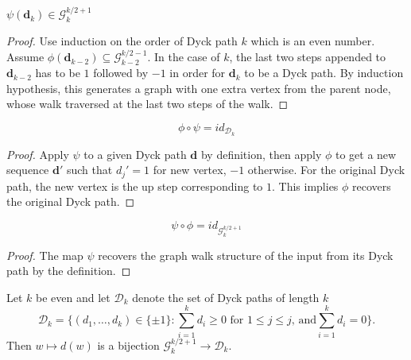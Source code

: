 \begin{lemma}
  \notready
  \label{lem:Dyck_graph_correspondence}
  $\psi(\mathbf{d}_k) \in \mathcal{G}^{k/2 + 1}_k$
\end{lemma}

\begin{proof}
  \notready
  Use induction on the order of Dyck path $k$ which is an even number. Assume $\phi(\mathbf{d}_{k-2})
  \subseteq \mathcal{G}_{k-2}^{k/2 -1}$. In the case of $k$, the last two steps appended to $\mathbf{d}_{k-2}$
  has to be $1$ followed by $-1$ in order for $\mathbf{d}_k$ to be a Dyck path. By induction hypothesis,
  this generates a graph with one extra vertex from the parent node, whose walk traversed at the last two steps of the walk.
\end{proof}


\begin{lemma}
  \notready
  \label{lem:composition1}
  $$\phi \circ \psi = id_{\mathcal{D}_k}$$
\end{lemma}

\begin{proof}
  \notready
  Apply $\psi$ to a given Dyck path $\mathbf{d}$ by definition, then apply $\phi$ to get a new sequence
  $\mathbf{d}'$ such that $d_j' = 1$ for new vertex, $-1$ otherwise. For the original Dyck path, the new
  vertex is the up step corresponding to $1$. This implies $\phi$ recovers the original Dyck path.
\end{proof}


\begin{lemma}
  \notready
  \label{lem:composition2}
  $$\psi \circ \phi = id_{\mathcal{G}^{k/2 + 1}_k}$$
\end{lemma}

\begin{proof}
  \notready
  The map $\psi$ recovers the graph walk structure of the input from its Dyck path by the definition.
\end{proof}


\begin{lemma}
  \notready
  \label{lem:walk_to_Dyck_paths_bijection}
  Let $k$ be even and let $\mathcal{D}_k$ denote the set of Dyck paths of length $k$
  \[ \mathcal{D}_k = \{(d_1,\ldots,d_k)\in\{\pm 1\}\colon \sum_{i=1}^k d_i\ge 0\text{ for }1\le j\le j\text{, and}\sum_{i=1}^kd_i=0\}. \]
  Then $w\mapsto {d}(w)$ is a bijection $\mathcal{G}_k^{k/2+1}\to\mathcal{D}_k$.
\end{lemma}

